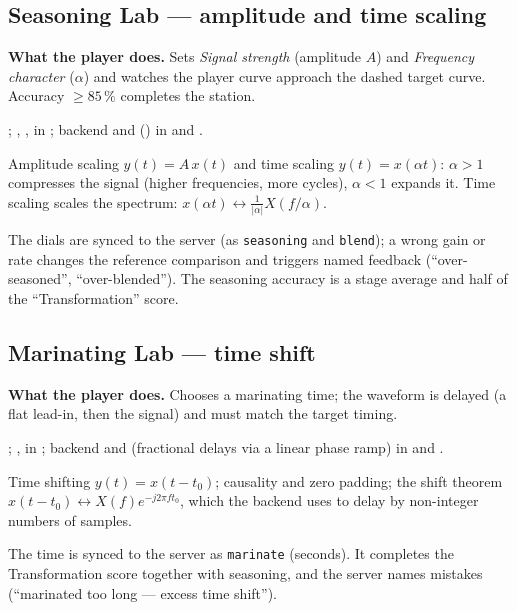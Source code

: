 \documentclass[11pt,a4paper]{article}
\begin{document}
\subsection{Seasoning Lab --- amplitude and time scaling}
\textbf{What the player does.} Sets \emph{Signal strength} (amplitude $A$) and
\emph{Frequency character} ($\alpha$) and watches the player curve approach the
dashed target curve. Accuracy $\geq 85\,\%$ completes the station.

\begin{filesbox}
; ,
,  in ;
backend  and  () in
 and .
\end{filesbox}
\begin{conceptbox}
Amplitude scaling $y(t)=A\,x(t)$ and time scaling $y(t)=x(\alpha t)$: $\alpha>1$
compresses the signal (higher frequencies, more cycles), $\alpha<1$ expands it.
Time scaling scales the spectrum: $x(\alpha t)\leftrightarrow\frac{1}{|\alpha|}X(f/\alpha)$.
\end{conceptbox}
\begin{impactbox}
The dials are synced to the server (as \texttt{seasoning} and \texttt{blend}); a
wrong gain or rate changes the reference comparison and triggers named feedback
(``over-seasoned'', ``over-blended''). The seasoning accuracy is a stage average and
half of the ``Transformation'' score.
\end{impactbox}

\subsection{Marinating Lab --- time shift}
\textbf{What the player does.} Chooses a marinating time; the waveform is delayed
(a flat lead-in, then the signal) and must match the target timing.

\begin{filesbox}
; ,
 in ; backend 
and  (fractional delays via a linear phase ramp) in
 and .
\end{filesbox}
\begin{conceptbox}
Time shifting $y(t)=x(t-t_0)$; causality and zero padding; the shift theorem
$x(t-t_0)\leftrightarrow X(f)e^{-j2\pi f t_0}$, which the backend uses to delay by
non-integer numbers of samples.
\end{conceptbox}
\begin{impactbox}
The time is synced to the server as \texttt{marinate} (seconds). It completes the
Transformation score together with seasoning, and the server names mistakes
(``marinated too long --- excess time shift'').
\end{impactbox}
\end{document}
